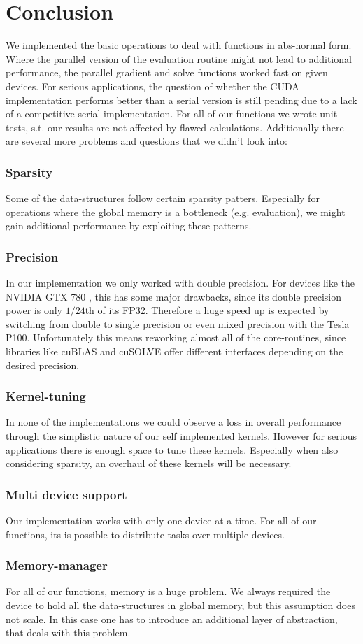 \section{Conclusion}
We implemented the basic operations to deal with functions in abs-normal form. Where the parallel version of the evaluation routine might not lead to additional performance, the parallel gradient and solve functions worked fast on given devices. For serious applications, the question of whether the CUDA implementation performs better than a serial version is still pending due to a lack of a competitive serial implementation.
For all of our functions we wrote unit-tests, s.t. our results are not affected by flawed calculations.
Additionally there are several more problems and questions that we didn't look into:

\subsubsection{Sparsity}
Some of the data-structures follow certain sparsity patters. Especially for operations where the global memory is a bottleneck (e.g. evaluation), we might gain additional performance by exploiting these patterns.

\subsubsection{Precision}
In our implementation we only worked with double precision. For devices like the NVIDIA GTX 780 , this has some major drawbacks, since its double precision power is only $1/24$th of its FP32. Therefore a huge speed up is expected by switching from double to single precision or even mixed precision with the Tesla P100.
Unfortunately this means reworking almost all of the core-routines, since libraries like cuBLAS and cuSOLVE offer different interfaces depending on the desired precision.

\subsubsection{Kernel-tuning}
In none of the implementations we could observe a loss in overall performance through the simplistic nature of our self implemented kernels. However for serious applications there is enough space to tune these kernels. Especially when also considering sparsity, an overhaul of these kernels will be necessary.

\subsubsection{Multi device support}
Our implementation works with only one device at a time. For all of our functions, its is possible to distribute tasks over multiple devices.

\subsubsection{Memory-manager}
For all of our functions, memory is a huge problem. We always required the device to hold all the data-structures in global memory, but this assumption does not scale. In this case one has to introduce an additional layer of abstraction, that deals with this problem.
